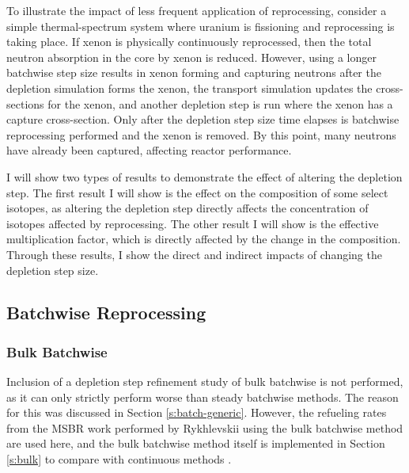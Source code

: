 To illustrate the impact of less frequent application of reprocessing, consider a simple thermal-spectrum system where uranium is fissioning and reprocessing is taking place.
If xenon is physically continuously reprocessed, then the total neutron absorption in the core by xenon is reduced.
However, using a longer batchwise step size results in xenon forming and capturing neutrons after the depletion simulation forms the xenon, the transport simulation updates the cross-sections for the xenon, and another depletion step is run where the xenon has a capture cross-section.
Only after the depletion step size time elapses is batchwise reprocessing performed and the xenon is removed.
By this point, many neutrons have already been captured, affecting reactor performance.

I will show two types of results to demonstrate the effect of altering the depletion step.
The first result I will show is the effect on the composition of some select isotopes, as altering the depletion step directly affects the concentration of isotopes affected by reprocessing.
The other result I will show is the effective multiplication factor, which is directly affected by the change in the composition.
Through these results, I show the direct and indirect impacts of changing the depletion step size.

\subsection{Batchwise Reprocessing}

\subsubsection{Bulk Batchwise}

Inclusion of a depletion step refinement study of bulk batchwise is not performed, as it can only strictly perform worse than steady batchwise methods.
The reason for this was discussed in Section \ref{s:batch-generic}.
However, the refueling rates from the MSBR work performed by Rykhlevskii using the bulk batchwise method are used here, and the bulk batchwise method itself is implemented in Section \ref{s:bulk} to compare with continuous methods \cite{rykhlevskii_advanced_2018}.

